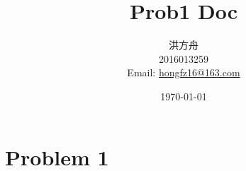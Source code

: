 \documentclass[12pt]{article}
\title{Prob1 Doc}
\author{洪方舟\\2016013259\\Email: \href{mailto:hongfz16@163.com}{hongfz16@163.com}}
\date{\today}
\begin{document}
  \maketitle
  \section*{Problem 1}
  
\end{document}
